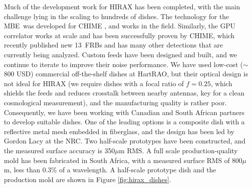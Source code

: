 \documentclass[letterpaper,11pt,preprint]{aastex}
\newcommand{\mbe}{{\rm MBE}}
\begin{document}
Much of the development work for HIRAX has been completed, with the
main challenge lying in the scaling to hundreds of dishes.  The
technology for the \mbe\ was developed for CHIME \citep{Bandura16},
and works in the field.  Similarly, the GPU correlator
\citep{Recnik15} works at scale {\color{red}and has been successfully
  proven by CHIME, which recently published new 13~FRBs
  \citep{chime_frbs} and has many other detections that are currently
  being analyzed}.  Custom feeds have been designed and built, and we
continue to iterate to improve their noise performance.
We have used low-cost ($\sim$800 USD) commercial off-the-shelf dishes
at HartRAO, but their optical design is not ideal for HIRAX (we
require dishes with a focal ratio of $f=0.25$, which shields the feeds
and reduces crosstalk between nearby antennas, key for a clean
cosmological measurement), and the manufacturing quality is rather
poor.  Consequently, we have been working with Canadian and South
African partners to develop suitable dishes.  {\color{red}One of the
  leading options is a composite dish with a reflective metal mesh
  embedded in fiberglass, and the design has been led by Gordon Lacy
  at the NRC.  Two half-scale prototypes have been constructed, and
  the measured surface accuracy is 350$\mu$m RMS.  A full scale
  production-quality mold has been fabricated in South Africa, with a
  measured surface RMS of 800$\mu$m, less than 0.3\% of a wavelength.}
A half-scale prototype dish and the production mold are shown in
Figure \ref{fig:hirax_dishes}.
\end{document}
